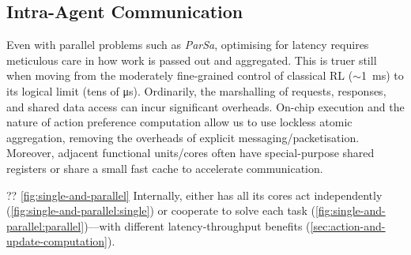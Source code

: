 \subsection{Intra-Agent Communication}\label{sec:intra-agent-communication}
Even with parallel problems such as \emph{ParSa}, optimising for latency requires meticulous care in how work is passed out and aggregated.
This is truer still when moving from the moderately fine-grained control of classical RL ($\sim$\qty{1}{\milli\second}) to its logical limit (tens of \si{\micro\second}).
Ordinarily, the marshalling of requests, responses, and shared data access can incur significant overheads.
On-chip execution and the nature of action preference computation allow us to use lockless atomic aggregation, removing the overheads of explicit messaging/packetisation.
Moreover, adjacent functional units/cores often have special-purpose shared registers or share a small fast cache to accelerate communication.

?? \cref{fig:single-and-parallel}
Internally, \approachshort{} either has all its cores act independently (\cref{fig:single-and-parallel:single}) or cooperate to solve each task (\cref{fig:single-and-parallel:parallel})---with different latency-throughput benefits (\cref{sec:action-and-update-computation}).


